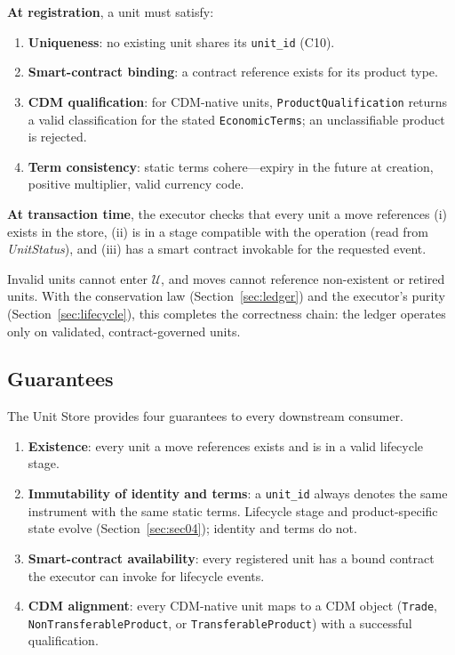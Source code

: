 \noindent\textbf{At registration}, a unit must satisfy:
\begin{enumerate}[nosep]
\item \textbf{Uniqueness}: no existing unit shares its \texttt{unit\_id} (C10).
\item \textbf{Smart-contract binding}: a contract reference exists for its product type.
\item \textbf{CDM qualification}: for CDM-native units, \texttt{ProductQualification} returns a valid classification for the stated \texttt{EconomicTerms}; an unclassifiable product is rejected.
\item \textbf{Term consistency}: static terms cohere---expiry in the future at creation, positive multiplier, valid currency code.
\end{enumerate}

\noindent\textbf{At transaction time}, the executor checks that every unit a move references (i) exists in the store, (ii) is in a stage compatible with the operation (read from \emph{UnitStatus}), and (iii) has a smart contract invokable for the requested event.

Invalid units cannot enter $\mathcal{U}$, and moves cannot reference non-existent or retired units. With the conservation law (Section~\ref{sec:ledger}) and the executor's purity (Section~\ref{sec:lifecycle}), this completes the correctness chain: the ledger operates only on validated, contract-governed units.

\subsection{Guarantees}

The Unit Store provides four guarantees to every downstream consumer.

\begin{enumerate}
\item \textbf{Existence}: every unit a move references exists and is in a valid lifecycle stage.
\item \textbf{Immutability of identity and terms}: a \texttt{unit\_id} always denotes the same instrument with the same static terms. Lifecycle stage and product-specific state evolve (Section~\ref{sec:sec04}); identity and terms do not.
\item \textbf{Smart-contract availability}: every registered unit has a bound contract the executor can invoke for lifecycle events.
\item \textbf{CDM alignment}: every CDM-native unit maps to a CDM object (\texttt{Trade}, \texttt{Non\allowbreak{}Transferable\allowbreak{}Product}, or \texttt{Transferable\allowbreak{}Product}) with a successful qualification.
\end{enumerate}

